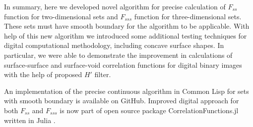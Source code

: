 \documentclass[preprint]{elsarticle}
\begin{document}
In summary, here we developed novel algorithm for precise calculation of
$F_{ss}$ function for two-dimensional sets and $F_{sss}$ function for
three-dimensional sets. These sets must have smooth boundary for the algorithm
to be applicable. With help of this new algorithm we introduced some additional
testing techniques for digital computational methodology, including concave
surface shapes.  In particular, we were able to demonstrate the improvement in
calculations of surface-surface and surface-void correlation functions for
digital binary images with the help of proposed $H'$ filter.

An implementation of the precise continuous algorithm in Common Lisp for sets
with smooth boundary is available on GitHub\cite{diff-boundary-corrfn}. Improved
digital approach for both $F_{ss}$ and $F_{sss}$ is now part of open source
package CorrelationFunctions.jl written in Julia \cite{CFs.jl}.


\end{document}
